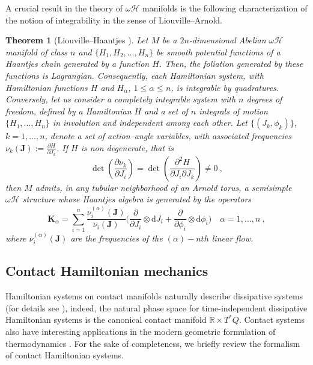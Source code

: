 \documentclass[10pt]{amsart}
\numberwithin{equation}{section}
\newcommand{\beq}{\begin{equation}}
\newcommand{\eeq}{\end{equation}}
\newcommand{\rd}{\mathrm{d}}
\newtheorem{theorem}{Theorem}
\theoremstyle{definition}
\begin{document}
A crucial result in the theory of $\omega \mathscr{H}$ manifolds is the following characterization of the notion of  integrability in the sense  of Liouville--Arnold.
\begin{theorem}[Liouville--Haantjes \cite{TT2022AMPA}]\label{th:HAL}
Let $M$ be a $2n$-dimensional Abelian $\omega \mathscr{H}$ manifold of class $n$ and $\{H_1,H_2, \ldots, H_n\}$ be smooth potential functions of a Haantjes chain generated by a function $H$.  Then, the foliation generated by these functions is Lagrangian. Consequently,  each Hamiltonian system, with Hamiltonian functions $H$ and $H_\alpha$, $1\le \alpha \le n$, is integrable by quadratures.
Conversely, let us consider  a completely integrable system with $n$ degrees of freedom, defined by a Hamiltonian $H$ and a set of $n$  integrals of motion  $\{H_1,\ldots,H_n \}$ in involution  and independent among each other. Let $\{(J_k,\phi_k)\}$,   $k =1,\ldots, n$, denote a set of action--angle variables, with associated frequencies $\nu_{k}(\boldsymbol{J}):=\frac{\partial{H}}{\partial J_{k}}$. If $H$ is non degenerate, that is
\begin{equation}\label{eq:And}
\det\left(\frac{\partial \nu_k}{\partial J_i} \right)=\det\left(\frac{\partial^2 H}{\partial J_i \partial J_k} \right)\neq 0 \ ,
\end{equation}
then $M$ admits, in any tubular neighborhood of an Arnold  torus, a semisimple $\omega \mathscr{H}$ structure  whose Haantjes algebra is generated by the operators
\beq \label{eq:LAA}
\boldsymbol{K}_\alpha=\sum _{i=1}^n \frac{\nu_i^{(\alpha)}(\boldsymbol{J})}{\nu_i (\boldsymbol{J})}\bigg (\frac{\partial}{\partial J_i}\otimes \rd J_i +\frac{\partial}{\partial \phi_i}\otimes \rd \phi_i \bigg )\quad \alpha=1,\ldots,n
\ ,
 \eeq
 where $\nu_i^{(\alpha)}(\boldsymbol{J})$ are the frequencies of the $(\alpha)-nth$ linear flow.
 \end{theorem}



\subsection{Contact Hamiltonian mechanics}
\label{seccontact}
Hamiltonian systems on contact manifolds naturally describe dissipative systems (for details see \cite{BCTAOP2017,dLS2017}), indeed, the natural phase space for time-independent dissipative Hamiltonian systems is the canonical contact manifold $\mathbb{R}\times T^{*}Q$. Contact systems also have interesting applications in the modern geometric formulation of thermodynamics \cite{BEnt2017}.
For the sake of completeness, we briefly review the formalism of contact Hamiltonian systems.
\end{document}
